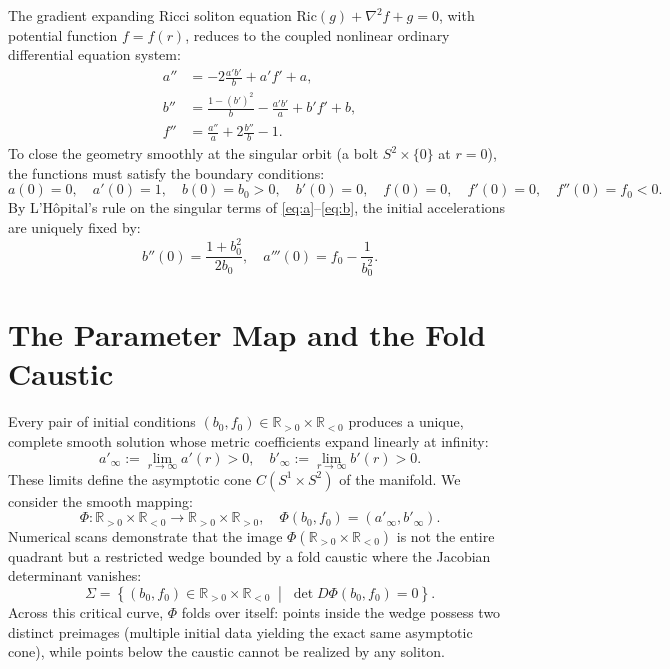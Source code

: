 \documentclass[12pt]{article}
\begin{document}
The gradient expanding Ricci soliton equation $\text{Ric}(g) + \nabla^2 f + g = 0$, with potential function $f = f(r)$, reduces to the coupled nonlinear ordinary differential equation system:
\begin{align}
a'' &= -2\frac{a'b'}{b} + a'f' + a, \label{eq:a} \\
b'' &= \frac{1 - (b')^2}{b} - \frac{a'b'}{a} + b'f' + b, \label{eq:b} \\
f'' &= \frac{a''}{a} + 2\frac{b''}{b} - 1. \label{eq:f}
\end{align}
To close the geometry smoothly at the singular orbit (a bolt $S^2 \times \{0\}$ at $r = 0$), the functions must satisfy the boundary conditions:
\begin{equation}
a(0) = 0, \quad a'(0) = 1, \quad b(0) = b_0 > 0, \quad b'(0) = 0, \quad f(0) = 0, \quad f'(0) = 0, \quad f''(0) = f_0 < 0.
\end{equation}
By L'H\^opital's rule on the singular terms of \eqref{eq:a}--\eqref{eq:b}, the initial accelerations are uniquely fixed by:
\begin{equation}
b''(0) = \frac{1 + b_0^2}{2b_0}, \quad a'''(0) = f_0 - \frac{1}{b_0^2}.
\end{equation}

\section{The Parameter Map and the Fold Caustic}

Every pair of initial conditions $(b_0, f_0) \in \mathbb{R}_{>0} \times \mathbb{R}_{<0}$ produces a unique, complete smooth solution whose metric coefficients expand linearly at infinity:
\begin{equation}
a'_\infty := \lim_{r \to \infty} a'(r) > 0, \quad b'_\infty := \lim_{r \to \infty} b'(r) > 0.
\end{equation}
These limits define the asymptotic cone $C(S^1 \times S^2)$ of the manifold. We consider the smooth mapping:
\begin{equation}
\Phi: \mathbb{R}_{>0} \times \mathbb{R}_{<0} \longrightarrow \mathbb{R}_{>0} \times \mathbb{R}_{>0}, \quad \Phi(b_0, f_0) = (a'_\infty, b'_\infty).
\end{equation}
Numerical scans demonstrate that the image $\Phi(\mathbb{R}_{>0} \times \mathbb{R}_{<0})$ is not the entire quadrant but a restricted wedge bounded by a fold caustic where the Jacobian determinant vanishes:
\begin{equation}
\Sigma = \left\{ (b_0, f_0) \in \mathbb{R}_{>0} \times \mathbb{R}_{<0} \;\middle|\; \det D\Phi(b_0, f_0) = 0 \right\}.
\end{equation}
Across this critical curve, $\Phi$ folds over itself: points inside the wedge possess two distinct preimages (multiple initial data yielding the exact same asymptotic cone), while points below the caustic cannot be realized by any soliton.
\end{document}
